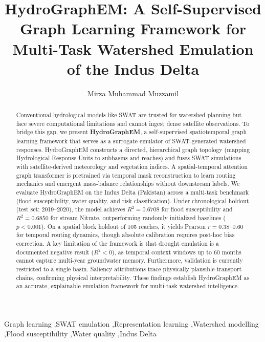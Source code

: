 \documentclass[preprint,12pt]{elsarticle}
\begin{document}
\begin{frontmatter}

\title{HydroGraphEM: A Self-Supervised Graph Learning Framework for Multi-Task Watershed Emulation of the Indus Delta}

\author[inst1]{Mirza Muhammad Muzzamil}



\begin{abstract}
Conventional hydrological models like SWAT are trusted for watershed planning but face severe computational limitations and cannot ingest dense satellite observations. To bridge this gap, we present \textbf{HydroGraphEM}, a self-supervised spatiotemporal graph learning framework that serves as a surrogate emulator of SWAT-generated watershed responses. HydroGraphEM constructs a directed, hierarchical graph topology (mapping Hydrological Response Units to subbasins and reaches) and fuses SWAT simulations with satellite-derived meteorology and vegetation indices. A spatial-temporal attention graph transformer is pretrained via temporal mask reconstruction to learn routing mechanics and emergent mass-balance relationships without downstream labels. We evaluate HydroGraphEM on the Indus Delta (Pakistan) across a multi-task benchmark (flood susceptibility, water quality, and risk classification). Under chronological holdout (test set: 2019--2020), the model achieves $R^2 = 0.6708$ for flood susceptibility and $R^2 = 0.6850$ for stream Nitrate, outperforming randomly initialized baselines ($p < 0.001$). On a spatial block holdout of 105 reaches, it yields Pearson $r = 0.38$--$0.60$ for temporal routing dynamics, though absolute calibration requires post-hoc bias correction. A key limitation of the framework is that drought emulation is a documented negative result ($R^2 < 0$), as temporal context windows up to 60 months cannot capture multi-year groundwater memory. Furthermore, validation is currently restricted to a single basin. Saliency attributions trace physically plausible transport chains, confirming physical interpretability. These findings establish HydroGraphEM as an accurate, explainable emulation framework for multi-task watershed intelligence.
\end{abstract}

\begin{keyword}
Graph learning \sep SWAT emulation \sep Representation learning \sep Watershed modelling \sep Flood susceptibility \sep Water quality \sep Indus Delta
\end{keyword}

\end{frontmatter}
\end{document}
